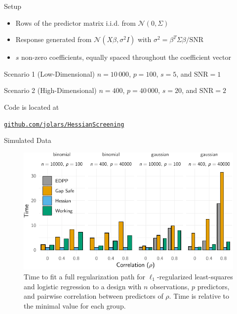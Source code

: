 \begin{frame}{Setup}
  \begin{itemize}
    \item Rows of the predictor matrix i.i.d. from
          \(\mathcal{N}(0,\Sigma)\)
    \item Response generated from \(\mathcal{N}(X\beta,\sigma^2 I)\)
          with
          \(\sigma^2 = \beta^T\Sigma \beta/\text{SNR}\)
    \item \(s\) non-zero coefficients, equally spaced throughout the
        coefficient vector
  \end{itemize}

  \begin{block}{Scenario 1 (Low-Dimensional)}
    \(n = 10\,000\), \(p = 100\), \(s = 5\), and \(\text{SNR} = 1\)
  \end{block}

  \begin{block}{Scenario 2 (High-Dimensional)}
    \(n = 400\), \(p = 40\,000\), \(s = 20\), and \(\text{SNR} = 2\)
  \end{block}

  \medskip

  Code is located at

  \href{https://github.com/jolars/HessianScreening}{\nolinkurl{github.com/jolars/HessianScreening}}
\end{frame}

\begin{frame}{Simulated Data}

  \begin{figure}
    \centering
    \includegraphics{figures/simulateddata-timings}
    \caption{Time to fit a full regularization path for
      \(\ell_1\)-regularized least-squares and logistic regression to
      a design with \(n\) observations, \(p\) predictors, and pairwise
      correlation between predictors of \(\rho\). Time is relative to the
      minimal value for each group.}
  \end{figure}

\end{frame}

